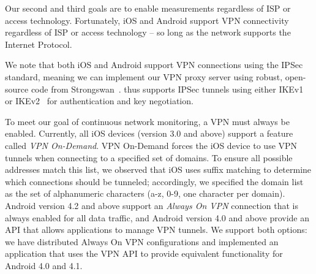 Our second and third goals are 
to enable measurements regardless of ISP or access technology. 
Fortunately, iOS and Android support VPN connectivity regardless of  
ISP or access technology -- so long as the network supports the Internet Protocol. 

We note that both iOS and Android support VPN connections 
using the IPSec standard, meaning we can implement our VPN proxy 
server using robust, open-source code from Strongswan~\cite{strongswan}. 
\platname{} thus supports IPSec tunnels using either IKEv1 or
IKEv2~\cite{rfc5996} for authentication and key negotiation.


To meet our goal of continuous network monitoring,
a VPN must always be enabled. Currently, all iOS devices (version 3.0
and above) support a feature called \textit{VPN On-Demand}.  VPN
On-Demand forces the iOS device to use VPN tunnels when connecting to
a specified set of domains. To ensure all possible addresses match this list, 
we observed that iOS uses suffix matching to determine which connections 
should be tunneled; accordingly, we specified the domain list as the set of 
alphanumeric characters (a-z, 0-9, one character per domain). 
Android version 4.2 and above support an
\textit{Always On VPN} connection that is always enabled for all data
traffic, and Android version 4.0 and above provide an API that allows
applications to manage VPN tunnels. We support both options: we have distributed Always On VPN 
configurations and implemented an application that
uses the VPN API to provide equivalent functionality for
Android 4.0 and 4.1.






